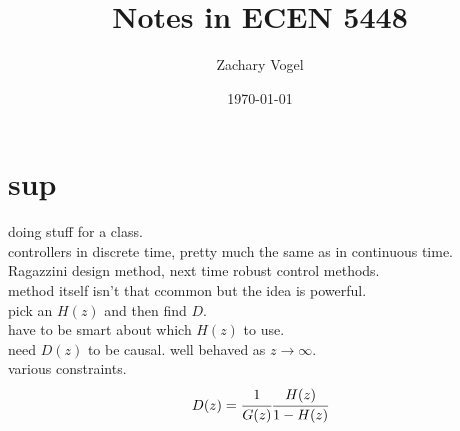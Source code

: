 \documentclass{article}
\author{Zachary Vogel}
\date{\today}
\title{Notes in ECEN 5448}
\begin{document}
\maketitle


\section*{sup}
doing stuff for a class.\\
controllers in discrete time, pretty much the same as in continuous time.\\


Ragazzini design method, next time robust control methods.\\
method itself isn't that ccommon but the idea is powerful.\\
pick an $H(z)$ and then find $D$.\\
have to be smart about which $H(z)$ to use.\\
need $D(z)$ to be causal. well behaved as $z\to\infty$.\\
various constraints.\\
\[D(z)=\cfrac{1}{G(z)}\cfrac{H(z)}{1-H(z)}\]
\end{document}

